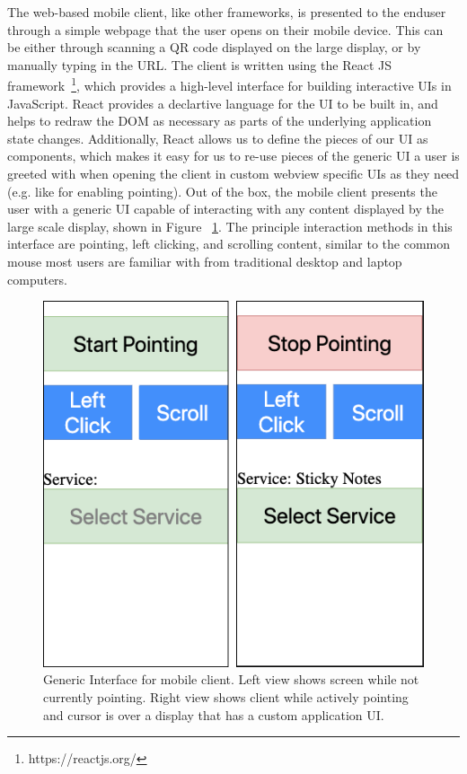 The web-based mobile client, like other frameworks, is presented to the enduser through a simple webpage that the user opens on their
mobile device. This
can be either through scanning a QR code displayed on the large
display, or by manually typing in the URL. The client is
written using the React JS
framework~\footnote{https://reactjs.org/}, which provides a
high-level interface for building interactive UIs in JavaScript.
React provides a declartive language for the UI to be built in,
and helps to redraw the DOM as necessary as parts of the underlying
application state changes. Additionally, React allows us to define
the pieces of our UI as components, which makes it easy for us to
re-use pieces of the generic UI a user is greeted with when opening
the client in custom webview specific UIs as they need (e.g. like
for enabling pointing).
Out of the box, the mobile client presents the user with a generic
UI capable of interacting with any content displayed by the
large scale display, shown in Figure ~\ref{fig:mobile_start_ui}. The principle interaction methods in this
interface are pointing, left clicking, and scrolling content, similar
to the common mouse most users are familiar with from traditional
desktop and laptop computers.

\begin{figure}
\centering
  \includegraphics[width=0.65\columnwidth]{figures/generic_mobile_client}
  \caption{Generic Interface for mobile client. Left view shows
  screen while not currently pointing. Right view shows client
  while actively pointing and cursor is over a display that has a custom application UI.}
  \label{fig:mobile_start_ui}
\end{figure}

